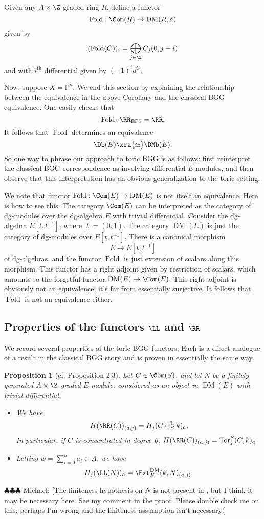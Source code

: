 \documentclass[12pt]{amsart}
\newtheorem{prop}[lemma]{Proposition}
\theoremstyle{definition}
\theoremstyle{remark}
\newcommand{\PP}{\mathbb P}
\newcommand{\Tor}{\operatorname{Tor}}
\newcommand{\michael}[1]{{\color{red} \sf $\clubsuit\clubsuit\clubsuit$ Michael: [#1]}}
\def\on{\operatorname}
\def\DM{\operatorname{DM}}
\def\th{\on{th}}
\begin{document}
Given any $A \times \Z$-graded ring $R$, define a functor
$$
\on{Fold} : \Com(R) \to \DM(R, a)
$$
given by
$$
(\on{Fold}(C))_i = \bigoplus_{j \in \Z} C_j(0, j-i)
$$
and with $i^{\th}$ differential given by $(-1)^id^C$. 


Now, suppose $X = \PP^n$. We end this section by explaining the relationship between the equivalence in the above Corollary and the classical BGG equivalence. One easily checks that
$$
\on{Fold} \circ \RR_{\on{EFS}} = \RR.
$$
It follows that $\on{Fold}$ determines an equivalence
$$
\Db(E) \xra{\simeq} \DMb(E).
$$
So one way to phrase our approach to toric BGG is as follows: first reinterpret the classical BGG correspondence as involving differential $E$-modules, and then observe that this interpretation has an obvious generalization to the toric setting.

We note that functor $\on{Fold} : \Com(E) \to \DM(E)$ is not itself an equivalence. Here is how to see this. The category $\Com(E)$ can be interpreted as the category of dg-modules over the dg-algebra $E$ with trivial differential. Consider the dg-algebra $E[t, t^{-1}]$, where $|t| = (0, 1)$. The category $\DM(E)$ is just the category of dg-modules over $E[t, t^{-1}]$. There is a canonical morphism 
$$
E \to E[t, t^{-1}]
$$ 
of dg-algebras, and the functor $\on{Fold}$ is just extension of scalars along this morphism. This functor has a right adjoint given by restriction of scalars, which amounts to the forgetful functor $\DM(E) \to \Com(E)$. This right adjoint is obviously not an equivalence; it's far from essentially surjective. It follows that $\on{Fold}$ is not an equivalence either. 



\subsection{Properties of the functors $\LL$ and $\RR$}
We record several properties of the toric BGG functors. Each is a direct analogue of a result in the classical BGG story and is proven in essentially the same way.

\begin{prop}[cf. \cite{EFS} Proposition 2.3]
\label{tor} 
Let $C \in \Com(S)$, and let $N$ be a finitely generated $A \times \Z$-graded $E$-module, considered as an object in $\DM(E)$ with trivial differential.
\begin{itemize}
\item[(a)] We have
$$
H(\RR(C))_{(a, j)} = H_{j} (C \otimes^{\mathbb{L}}_S k)_a.
$$
In particular, if $C$ is concentrated in degree 0, $H(\RR(C))_{(a, j)} = \Tor_{j}^S(C, k)_a$

\item[(b)] Letting $w = \sum_{i = 0}^n a_i \in A$, we have
$$
H_j(\LL(N))_a=\Ext^{\DM}_E(k, N)_{(a, j)}.
$$
\end{itemize}
\end{prop}
\michael{The finiteness hypothesis on $N$ is not present in \cite[Proposition 2.3]{EFS}, but I think it may be necessary here. See my comment in the proof. Please double check me on this; perhaps I'm wrong and the finiteness assumption isn't necessary!}
\end{document}
